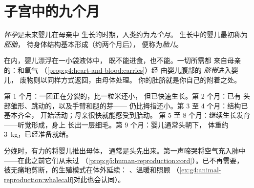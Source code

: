 \section{子宫中的九个月}

\begin{definition}[怀孕]\label{def:g5:human-reproduction:pregnancy}
\emph{怀孕}是未来婴儿在母亲中
生长的时期，人类约为\emph{九个月}。
生长中的婴儿最初称为
\emph{胚胎}，
待身体结构基本形成（约两个月后），
便称为\emph{胎儿}。
\end{definition}

\begin{proposition}[通过脐带获得营养]\label{prop:g5:human-reproduction:cord}
在内，婴儿漂浮在一小袋液体中，
既不能进食，也不能。一切所需都
来自母亲的：和氧气
（\cref{prop:g4:heart-and-blood:carries}）经
由婴儿腹部的
\emph{脐带}进入婴儿，
废物则以同样方式返回，由母体处理。
你的肚脐就是你自己的附着之处。
\end{proposition}
\admitted

\begin{example}[九个月的时间表]\label{ex:g5:human-reproduction:timetable}
第 1 个月：一团正在分裂的，比一粒米还小，
但已快速生长。第 2 个月：已有
头部雏形、跳动的，以及手臂和腿的芽——
仍比拇指还小。第 3 至 4 个月：结构已基本齐全，
开始活动；母亲很快就能感受到胎动。
第 5 至 8 个月：继续生长发育——听觉形成，身上
长出一层细毛。第 9 个月：婴儿通常头朝下，
体重约 \qty{3}{kg}，已经准备就绪。
\end{example}

\begin{example}[出生]\label{ex:g5:human-reproduction:birth}
分娩时，有力的将婴儿推出母体，
通常是头先出来。第一声啼哭将空气充入肺中
——在此之前它们从未过
（\cref{prop:g5:human-reproduction:cord}）。已不再需要，
被无痛地剪断，的生殖模式在体外延续：
、温暖和照顾
（\cref{ex:g4:animal-reproduction:whalecalf}对此也会认同）。
\end{example}

